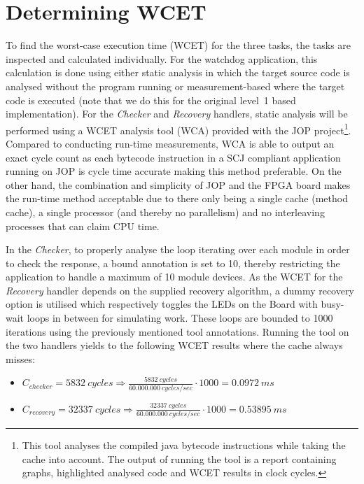 \section{Determining WCET} %
\label{sec:determining_wcet}
To find the worst-case execution time (WCET) for the three tasks, the tasks are inspected and calculated individually. For the watchdog application, this calculation is done using either static analysis in which the target source code is analysed without the program running or measurement-based where the target code is executed (note that we do this for the original level~1 based implementation). For the \textit{Checker} and \textit{Recovery} handlers, static analysis will be performed using a WCET analysis tool (WCA) provided with the JOP project\footnote{This tool analyses the compiled java bytecode instructions while taking the cache into account. The output of running the tool is a report containing graphs, highlighted analysed code and WCET results in clock cycles.}. Compared to conducting run-time measurements, WCA is able to output an exact cycle count as each bytecode instruction in a SCJ compliant application running on JOP is cycle time accurate making this method preferable. On the other hand, the combination and simplicity of JOP and the FPGA board makes the run-time method acceptable due to there only being a single cache (method cache), a single processor (and thereby no parallelism) and no interleaving processes that can claim CPU time.

In the \textit{Checker}, to properly analyse the loop iterating over each module in order to check the response, a bound annotation is set to 10, thereby restricting the application to handle a maximum of 10 module devices. As the WCET for the \textit{Recovery} handler depends on the supplied recovery algorithm, a dummy recovery option is utilised which respectively toggles the LEDs on the Board with busy-wait loops in between for simulating work. These loops are bounded to 1000 iterations using the previously mentioned tool annotations. Running the tool on the two handlers yields to the following WCET results where the cache always misses:
\begin{itemize}
    \item $C_{checker} = 5832\ cycles \Rightarrow \frac{5832\ cycles}{60.000.000\ cycles/sec} \cdot 1000 = 0.0972\ ms$
    \item $C_{recovery} = 32337\ cycles \Rightarrow \frac{32337\ cycles}{60.000.000\ cycles/sec} \cdot 1000 = 0.53895\ ms$
\end{itemize}

